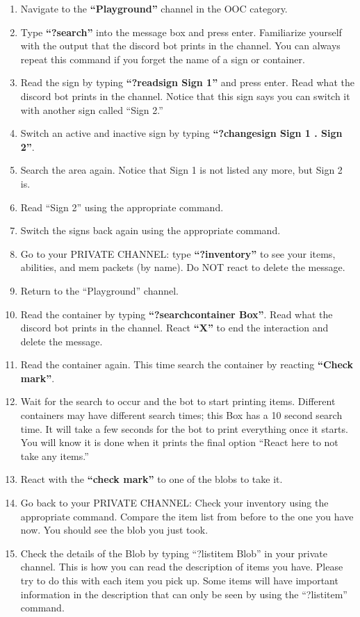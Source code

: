 \documentclass[green]{TMFHope}
\begin{document}
\begin{enumerate}
  \item Navigate to the \textbf{``Playground''} channel in the OOC category.
  \item Type \textbf{``?search''} into the message box and press enter. Familiarize yourself with the output that the discord  bot prints in the channel. You can always repeat this command if you forget the name of a sign or container.
	\item Read the sign by typing \textbf{``?readsign Sign 1''} and press enter. Read what the discord bot prints in the channel. Notice that this sign says you can switch it with another sign called ``Sign 2.''
	\item Switch an active and inactive sign by typing \textbf{``?changesign Sign 1 . Sign 2''}. 
	\item Search the area again. Notice that Sign 1 is not listed any more, but Sign 2 is.
	\item Read ``Sign 2'' using the appropriate command.
	\item Switch the signs back again using the appropriate command.
	\item Go to your PRIVATE CHANNEL: type \textbf{``?inventory''} to see your items, abilities, and mem packets (by name). Do NOT react to delete the message.
	\item Return to the ``Playground'' channel.
	\item Read the container by typing \textbf{``?searchcontainer Box''}. Read what the discord bot prints in the channel. React \textbf{``X''} to end the interaction and delete the message.
	\item Read the container again. This time search the container by reacting \textbf{``Check mark''}.
	\item Wait for the search to occur and the bot to start printing items. Different containers may have different search times; this Box has a 10 second search time. It will take a few seconds for the bot to print everything once it starts. You will know it is done when it prints the final option ``React here to not take any items.''
	\item React with the \textbf{``check mark''} to one of the blobs to take it.
	\item Go back to your PRIVATE CHANNEL: Check your inventory using the appropriate command. Compare the item list from before to the one you have now. You should see the blob you just took. 
	\item Check the details of the Blob by typing ``?listitem Blob'' in your private channel. This is how you can read the description of items you have. Please try to do this with each item you pick up. Some items will have important information in the description that can only be seen by using the ``?listitem'' command.

\end{enumerate}
\end{document}
